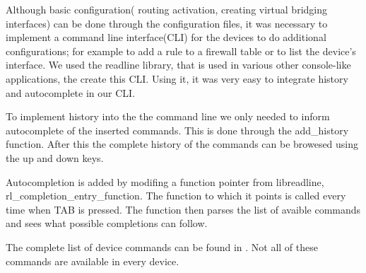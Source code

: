 Although basic configuration( routing activation, creating virtual bridging interfaces) can be done through the 
configuration files, it was necessary to implement a command line interface(CLI) for the devices to do additional configurations; 
for example to add a rule to a firewall table or to list the device's interface. We used the readline library, that is used in various
other console-like applications, the create this CLI. Using it, it was very easy to integrate history and autocomplete in our CLI.

To implement history into the the command line we only needed to inform autocomplete of the inserted commands. This is done through the
add_history function. After this the complete history of the commands can be browesed using the up and down keys.

Autocompletion is added by modifing a function pointer from libreadline, rl_completion_entry_function. The function to which it points
is called every time when TAB is pressed. The function then parses the list of avaible commands and sees what possible completions
can follow. 

The complete list of device commands can be found in . Not all of these commands are available in every device.
